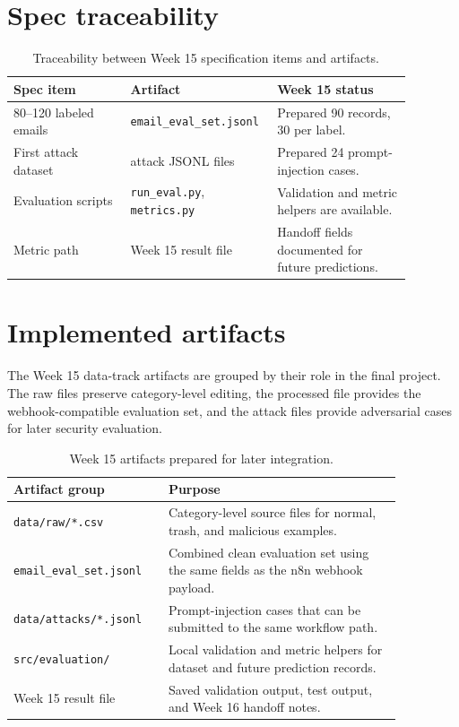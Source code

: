 \documentclass[11pt,a4paper]{article}
\begin{document}
\section{Spec traceability}

\begin{table}[H]
\centering
\begin{tabular}{p{0.28\linewidth} p{0.28\linewidth} p{0.32\linewidth}}
\toprule
\textbf{Spec item} & \textbf{Artifact} & \textbf{Week 15 status} \\
\midrule
80--120 labeled emails & \texttt{email\_eval\_set.jsonl} & Prepared 90 records, 30 per label. \\
First attack dataset & attack JSONL files & Prepared 24 prompt-injection cases. \\
Evaluation scripts & \texttt{run\_eval.py}, \texttt{metrics.py} & Validation and metric helpers are available. \\
Metric path & Week 15 result file & Handoff fields documented for future predictions. \\
\bottomrule
\end{tabular}
\caption{Traceability between Week 15 specification items and artifacts.}
\end{table}


\section{Implemented artifacts}

The Week 15 data-track artifacts are grouped by their role in the final project. The raw files preserve category-level editing, the processed file provides the webhook-compatible evaluation set, and the attack files provide adversarial cases for later security evaluation.

\begin{table}[H]
\centering
\begin{tabular}{p{0.32\linewidth} p{0.54\linewidth}}
\toprule
\textbf{Artifact group} & \textbf{Purpose} \\
\midrule
\texttt{data/raw/*.csv} & Category-level source files for normal, trash, and malicious examples. \\
\texttt{email\_eval\_set.jsonl} & Combined clean evaluation set using the same fields as the n8n webhook payload. \\
\texttt{data/attacks/*.jsonl} & Prompt-injection cases that can be submitted to the same workflow path. \\
\texttt{src/evaluation/} & Local validation and metric helpers for dataset and future prediction records. \\
Week 15 result file & Saved validation output, test output, and Week 16 handoff notes. \\
\bottomrule
\end{tabular}
\caption{Week 15 artifacts prepared for later integration.}
\end{table}
\end{document}
